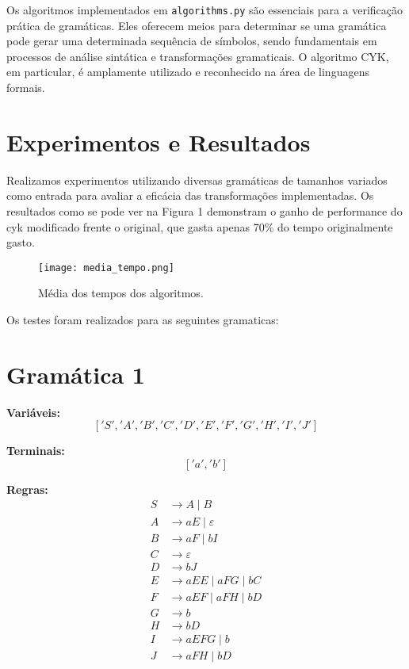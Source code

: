 \documentclass[a4paper,12pt]{article} %
\begin{document}
Os algoritmos implementados em \texttt{algorithms.py} são essenciais para a verificação prática de gramáticas. Eles oferecem meios para determinar se uma gramática pode gerar uma determinada sequência de símbolos, sendo fundamentais em processos de análise sintática e transformações gramaticais. O algoritmo CYK, em particular, é amplamente utilizado e reconhecido na área de linguagens formais.

\section{Experimentos e Resultados}

Realizamos experimentos utilizando diversas gramáticas de tamanhos variados como entrada para avaliar a eficácia das transformações implementadas. Os resultados como se pode ver na Figura 1 demonstram o ganho de performance do cyk modificado frente o original, que gasta apenas 70\% do tempo originalmente gasto.

\begin{figure}[!h]
\centering
\texttt{[image: media\_tempo.png]}
\caption{Média dos tempos dos algoritmos.}
\label{fig:Media_img}
\end{figure}

Os testes foram realizados para as seguintes gramaticas:

\section*{Gramática 1}
\textbf{Variáveis:}
\[
['S', 'A', 'B', 'C', 'D', 'E', 'F', 'G', 'H', 'I', 'J']
\]

\textbf{Terminais:}
\[
['a', 'b']
\]

\textbf{Regras:}
\begin{align*}
S &\to A \mid B \\
A &\to a E \mid \varepsilon \\
B &\to a F \mid b I \\
C &\to \varepsilon \\
D &\to b J \\
E &\to a E E \mid a F G \mid b C \\
F &\to a E F \mid a F H \mid b D \\
G &\to b \\
H &\to b D \\
I &\to a E F G \mid b \\
J &\to a F H \mid b D \\
\end{align*}
\end{document}
